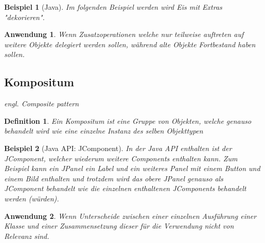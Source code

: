 \documentclass[a4paper]{article}
\theoremstyle{break}
\newtheorem{defi}{Definition}[section]
\newtheorem{ex}{Beispiel}[section]
\newtheorem{why}{Anwendung}[section]
\begin{document}
\begin{ex}[Java]
	Im folgenden Beispiel werden wird Eis mit Extras "dekorieren".
	
	
	
	
	
	
	
	
	
\end{ex}

\begin{why}
	Wenn Zusatzoperationen welche nur teilweise auftreten auf weitere Objekte delegiert werden sollen, während alte Objekte Fortbestand haben sollen.
\end{why}
\newpage
\subsection{Kompositum}

\textit{engl. Composite pattern}

\begin{defi}
	Ein Kompositum ist eine Gruppe von Objekten, welche genauso behandelt wird wie eine einzelne Instanz des selben Objekttypen
\end{defi}

\begin{ex}[Java API: JComponent]
	In der Java API enthalten ist der JComponent, welcher wiederum weitere Components enthalten kann.
	Zum Beispiel kann ein JPanel ein Label und ein weiteres Panel mit einem Button und einem Bild enthalten und trotzdem wird das obere JPanel genauso als JComponent behandelt wie die einzelnen enthaltenen JComponents behandelt werden (würden).
\end{ex}

\begin{why}
	Wenn Unterscheide zwischen einer einzelnen Ausführung einer Klasse und einer Zusammensetzung dieser für die Verwendung nicht von Relevanz sind.
\end{why}


	
\end{document}
